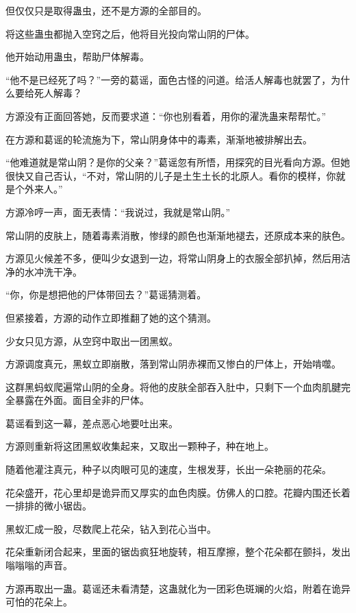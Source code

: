 
\begin{this_body}

但仅仅只是取得蛊虫，还不是方源的全部目的。

将这些蛊虫都抛入空窍之后，他将目光投向常山阴的尸体。

他开始动用蛊虫，帮助尸体解毒。

“他不是已经死了吗？”一旁的葛谣，面色古怪的问道。给活人解毒也就罢了，为什么要给死人解毒？

方源没有正面回答她，反而要求道：“你也别看着，用你的濯洗蛊来帮帮忙。”

在方源和葛谣的轮流施为下，常山阴身体中的毒素，渐渐地被排解出去。

“他难道就是常山阴？是你的父亲？”葛谣忽有所悟，用探究的目光看向方源。但她很快又自己否认，“不对，常山阴的儿子是土生土长的北原人。看你的模样，你就是个外来人。”

方源冷哼一声，面无表情：“我说过，我就是常山阴。”

常山阴的皮肤上，随着毒素消散，惨绿的颜色也渐渐地褪去，还原成本来的肤色。

方源见火候差不多，便叫少女退到一边，将常山阴身上的衣服全部扒掉，然后用洁净的水冲洗干净。

“你，你是想把他的尸体带回去？”葛谣猜测着。

但紧接着，方源的动作立即推翻了她的这个猜测。

少女只见方源，从空窍中取出一团黑蚁。

方源调度真元，黑蚁立即崩散，落到常山阴赤裸而又惨白的尸体上，开始啃噬。

这群黑蚂蚁爬遍常山阴的全身。将他的皮肤全部吞入肚中，只剩下一个血肉肌腱完全暴露在外面。面目全非的尸体。

葛谣看到这一幕，差点恶心地要吐出来。

方源则重新将这团黑蚁收集起来，又取出一颗种子，种在地上。

随着他灌注真元，种子以肉眼可见的速度，生根发芽，长出一朵艳丽的花朵。

花朵盛开，花心里却是诡异而又厚实的血色肉膜。仿佛人的口腔。花瓣内围还长着一排排的微小锯齿。

黑蚁汇成一股，尽数爬上花朵，钻入到花心当中。

花朵重新闭合起来，里面的锯齿疯狂地旋转，相互摩擦，整个花朵都在颤抖，发出嗡嗡嗡的声音。

方源再取出一蛊。葛谣还未看清楚，这蛊就化为一团彩色斑斓的火焰，附着在诡异可怕的花朵上。


\end{this_body}

